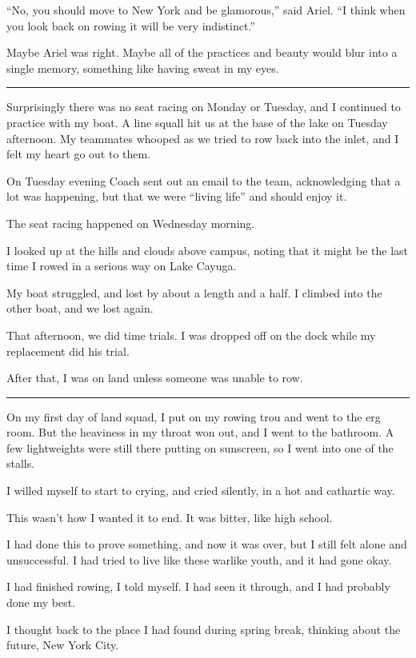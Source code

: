 ``No, you should move to New York and be glamorous,'' said Ariel.  ``I think
when you look back on rowing it will be very indistinct.''

Maybe Ariel was right.  Maybe all of the practices and beauty would blur into a
single memory, something like having sweat in my eyes.

\plainfancybreak{12pt}{2}{}

Surprisingly there was no seat racing on Monday or Tuesday, and I continued to
practice with my boat.  A line squall hit us at the base of the lake on Tuesday
afternoon.  My teammates whooped as we tried to row back into the inlet, and I
felt my heart go out to them.

On Tuesday evening Coach sent out an email to the team, acknowledging that a lot
was happening, but that we were ``living life'' and should enjoy it.

The seat racing happened on Wednesday morning.

I looked up at the hills and clouds above campus, noting that it might be the
last time I rowed in a serious way on Lake Cayuga.

My boat struggled, and lost by about a length and a half.  I climbed into the
other boat, and we lost again.

That afternoon, we did time trials.  I was dropped off on the dock while my
replacement did his trial.

After that, I was on land unless someone was unable to row.

\plainfancybreak{12pt}{2}{}

On my first day of land squad, I put on my rowing trou and went to the erg room.
But the heaviness in my throat won out, and I went to the bathroom.  A few
lightweights were still there putting on sunscreen, so I went into one of the
stalls.

I willed myself to start to crying, and cried silently, in a hot and cathartic
way.

This wasn't how I wanted it to end.  It was bitter, like high school.

I had done this to prove something, and now it was over, but I still felt alone
and unsuccessful.  I had tried to live like these warlike youth, and it had gone
okay.

I had finished rowing, I told myself.  I had seen it through, and I had probably
done my best.

I thought back to the place I had found during spring break, thinking about the
future, New York City.

